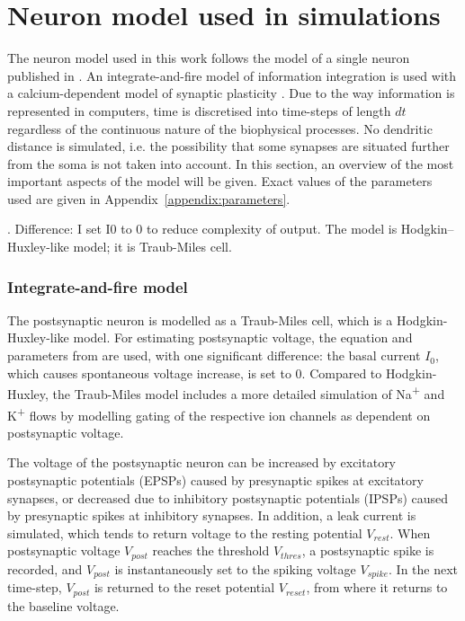 \documentclass[a4paper,12pt]{report}
\theoremstyle{definition}
\begin{document}
\section{Neuron model used in simulations}

The neuron model used in this work follows the model of a single neuron published in \cite{yeung2004synaptic}. An integrate-and-fire model of information integration is used with a calcium-dependent model of synaptic plasticity \cite{shouval2002unified}. Due to the way information is represented in computers, time is discretised into time-steps of length $dt$ regardless of the continuous nature of the biophysical processes. No dendritic distance is simulated, i.e. the possibility that some synapses are situated further from the soma is not taken into account. In this section, an overview of the most important aspects of the model will be given. Exact values of the parameters used are given in Appendix~\ref{appendix:parameters}.

\cite{ermentrout1998fine}. Difference: I set I0 to 0 to reduce complexity of output.
The model is Hodgkin–Huxley-like model;  it is Traub-Miles cell.


\subsubsection{Integrate-and-fire model}

The postsynaptic neuron is modelled as a Traub-Miles cell, which is a Hodgkin-Huxley-like model. For estimating postsynaptic voltage, the equation and parameters from \cite{ermentrout1998fine} are used, with one significant difference: the basal current $I_0$, which causes spontaneous voltage increase, is set to $0$. Compared to Hodgkin-Huxley, the Traub-Miles model includes a more detailed simulation of Na\textsuperscript{+} and K\textsuperscript{+} flows by modelling gating of the respective ion channels as dependent on postsynaptic voltage.

The voltage of the postsynaptic neuron can be increased by excitatory postsynaptic potentials (EPSPs) caused by presynaptic spikes at excitatory synapses, or decreased due to inhibitory postsynaptic potentials (IPSPs) caused by presynaptic spikes at inhibitory synapses. In addition, a leak current is simulated, which tends to return voltage to the resting potential $V_{rest}$. When postsynaptic voltage $V_{post}$ reaches the threshold $V_{thres}$, a postsynaptic spike is recorded, and $V_{post}$ is instantaneously set to the spiking voltage $V_{spike}$. In the next time-step, $V_{post}$ is returned to the reset potential $V_{reset}$, from where it returns to the baseline voltage.
\end{document}
